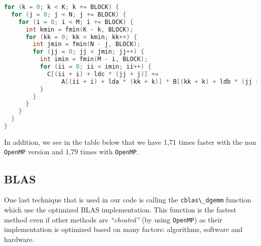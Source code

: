 \documentclass[
  12pt,
  xcolor = usenames,dvipsnames]{article}
\newcommand{\passthrough}[1]{#1}
\begin{document}
\begin{lstlisting}[language=C]
for (k = 0; k < K; k += BLOCK) {
  for (j = 0; j < N; j += BLOCK) {
    for (i = 0; i < M; i += BLOCK) {
      int kmin = fmin(K - k, BLOCK);
      for (kk = 0; kk < kmin; kk++) {
        int jmin = fmin(N - j, BLOCK);
        for (jj = 0; jj < jmin; jj++) {
          int imin = fmin(M - i, BLOCK);
          for (ii = 0; ii < imin; ii++) {
            C[(ii + i) + ldc * (jj + j)] +=
                A[(ii + i) + lda * (kk + k)] * B[(kk + k) + ldb * (jj + j)];
          }
        }
      }
    }
  }
}
\end{lstlisting}

In addition, we see in the table below that we have 1,71 times faster with the non \passthrough{\lstinline!OpenMP!} version and 1,79 times with \passthrough{\lstinline!OpenMP!}.

\begin{table}[!h]
\centering
{}
\end{table}

\hypertarget{blas}{%
\subsection{BLAS}\label{blas}}

One last technique that is used in our code is calling the \passthrough{\lstinline!cblas\_dgemm!} function which use the optimized BLAS implementation. This function is the fastest method even if other methods are \emph{``cheated''} (by using \passthrough{\lstinline!OpenMP!}) as their implementation is optimized based on many factors: algorithms, software and hardware.
\end{document}
